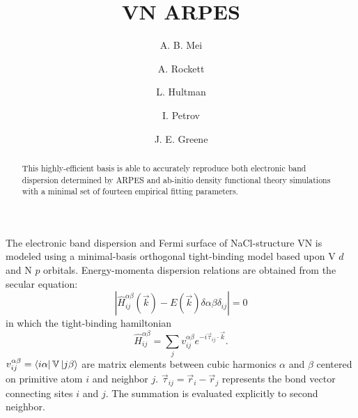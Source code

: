 \documentclass[twocolumn,showpacs,preprintnumbers,superscriptaddress,prb,floatfix,aps,10pt]{revtex4-1}
\newcommand*{\ham}{\hat{H}}
\newcommand*{\bondvec}{\vec{\tau}_{ij}}
\begin{document}

\title{VN ARPES}

\author{A. B. Mei}

\author{A. Rockett}

\author{L. Hultman}

\author{I. Petrov}

\author{J. E. Greene}

\begin{abstract}

This highly-efficient basis is able to accurately reproduce both electronic band dispersion determined by ARPES and ab-initio density functional theory simulations with a minimal set of fourteen empirical fitting parameters.
\end{abstract}

\maketitle


 

The electronic band dispersion and Fermi surface of NaCl-structure VN is modeled using a minimal-basis orthogonal tight-binding model based upon V $d$ and N $p$ orbitals. Energy-momenta dispersion relations are obtained from the secular equation:
\begin{equation}
\label{eq:secular}
\left| \ham^{\alpha\beta}_{ij}(\vec{k}) - E(\vec{k})\delta{\alpha\beta}\delta_{ij} \right| = 0
\end{equation}
in which the tight-binding hamiltonian
\begin{equation}
\label{eq:ham}
\ham^{\alpha\beta}_{ij} = \sum_j v^{\alpha\beta}_{ij} e^{-i\vec{\tau}_{ij} \cdot \vec{k} }.
\end{equation}
$v^{\alpha\beta}_{ij} = \bra{i\alpha} \mathbb{V} \ket{j\beta}$ are matrix elements between cubic harmonics $\alpha$ and $\beta$ centered on primitive atom $i$ and neighbor $j$. $\bondvec = \vec{r}_i - \vec{r}_j$ represents the bond vector connecting sites $i$ and $j$. The summation is evaluated explicitly to second neighbor.
\end{document}
